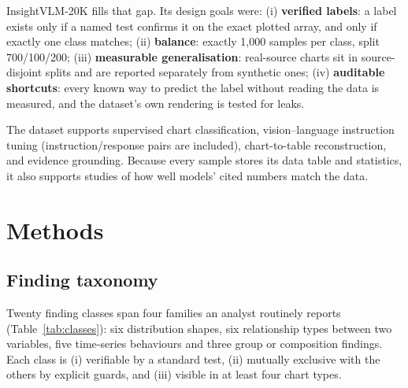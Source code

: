 \documentclass[11pt,a4paper]{article}
\begin{document}
InsightVLM-20K fills that gap. Its design goals were:
(i) \textbf{verified labels}: a label exists only if a named test confirms it on the
exact plotted array, and only if exactly one class matches;
(ii) \textbf{balance}: exactly 1{,}000 samples per class, split 700/100/200;
(iii) \textbf{measurable generalisation}: real-source charts sit in source-disjoint
splits and are reported separately from synthetic ones;
(iv) \textbf{auditable shortcuts}: every known way to predict the label without
reading the data is measured, and the dataset's own rendering is tested for leaks.

The dataset supports supervised chart classification, vision--language instruction
tuning (instruction/response pairs are included), chart-to-table reconstruction,
and evidence grounding. Because every sample stores its data table and statistics,
it also supports studies of how well models' cited numbers match the data.

\section*{Methods}

\subsection*{Finding taxonomy}
Twenty finding classes span four families an analyst routinely reports
(Table~\ref{tab:classes}): six distribution shapes, six relationship types between
two variables, five time-series behaviours and three group or composition findings.
Each class is (i) verifiable by a standard test, (ii) mutually exclusive with the
others by explicit guards, and (iii) visible in at least four chart types.
\end{document}
